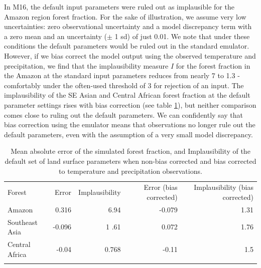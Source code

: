 \documentclass[gmd, manuscript]{copernicus}
\begin{document}
In M16, the default input parameters were ruled out as implausible for the Amazon region forest fraction. For the sake of illustration, we assume very low uncertainties: zero observational uncertainty and a model discrepancy term with a zero mean and an uncertainty ($\pm$ 1 sd) of just 0.01. We note that under these conditions the default parameters would be ruled out in the standard emulator.  However, if we bias correct the model output using the observed temperature and precipitation, we find that the implausibility measure $I$ for the forest fraction in the Amazon at the standard input parameters reduces from nearly 7 to 1.3 - comfortably under the often-used threshold of 3 for rejection of an input. The implausibility of the SE Asian and Central African forest fraction at the default parameter settings rises with bias correction (see table \ref{tab:default_implausibility}), but neither comparison comes close to ruling out the default parameters. We can confidently say that bias correction using the emulator means that observations no longer rule out the default parameters, even with the assumption of a very small model discrepancy.


\begin{table}[t]
\caption{Mean absolute error of the simulated forest fraction, and Implausibility of the default set of land surface parameters when non-bias corrected and bias corrected to temperature and precipitation observations.}
\begin{tabular}{lrrrr}
\tophline

Forest                & Error &    Implausibility &  Error (bias corrected) &   Implausibility (bias corrected) \\
\middlehline
Amazon                &       0.316 &         6.94    &    -0.079  &    1.31  \\
Southeast Asia      &      -0.096   &   1       .61 &  0.072      &   1.76\\
Central Africa          & -0.04  &         0.768        & -0.11    & 1.5       \\
\bottomhline
\end{tabular}
\belowtable{} %
\label{tab:default_implausibility}
\end{table}
\end{document}
